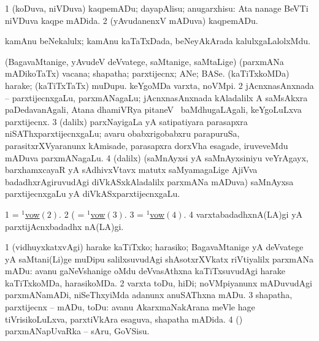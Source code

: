 \bentry 
{} 
\gl{\sakirx}
\expl{}
\bmng
\bnum
\num{1} (koDuva, niVDuva) kaqpemADu; dayapAlisu; anugarxhisu:  Ata nanage BeVTi niVDuva kaqpe mADida. 
\num{2} (yAvudanenxV mADuva) kaqpemADu. 
\enum
\emng
\eentry

\bentry 
{} 
\gl{\nA}
\expl{}
\bmng
 kamAnu beNekalulx; kamAnu kaTaTxDada, beNeyAkArada kalulxgaLalolxMdu. 
\emng
\eentry

\bentry 
{} 
\gl{\nA}
\expl{}
\bmng
\bnum
{} (BagavaMtanige, yAvudeV deVvatege, saMtanige, saMtaLige) 
\banum
{} (parxmANa mADikoTaTx) vacana; shapatha; parxtijecnx; ANe; BASe. 
 (kaTiTxkoMDa) harake; (kaTiTxTaTx) muDupu. 
 keYgoMDa varxta, noVMpi. 
\hypertarget{vow(1)2}{} 
\eanum
\numie
\num{2} jAcnxnasAnxnada -- parxtijecnxgaLu, parxmANagaLu; jAcnxnasAnxnada kAladalilx A saMsAkxra paDedavanAgali, Atana dhamiVRya pitaneV \mo\ baMdhugaLAgali, keYgoLuLxva parxtijecnx. 
\hypertarget{vow(1)3}{} 
\num{3} (\bava dalilx) parxNayigaLa yA satipatiyara parasapxra niSAThxparxtijecnxgaLu; avaru obabxrigobabxru parapuruSa, parasitxrXVyaranunx kAmisade, parasapxra dorxVha esagade, iruveveMdu mADuva parxmANagaLu. 
\hypertarget{vow(1)4}{} 
\num{4} (\bava dalilx) (saMnAyxsi yA saMnAyxsiniyu veYrAgayx, barxhamxcayaR yA sAdhivxVtavx matutx saMyamagaLige AjiVva badadhxrAgiruvudAgi diVkASxkAladalilx parxmANa mADuva) saMnAyxsa parxtijecnxgaLu yA diVkASxparxtijecnxgaLu. 
\enum
\emng

\noindent 
\gl{\pagu}
\expl{}
\bmng
\bnum
\num{1}  = \hyperlink{vow(1)2}{$^1$vow\((2)\)}. 
\num{2}  (  = \hyperlink{vow(1)3}{$^1$vow\((3)\)}. 
\num{3}  = \hyperlink{vow(1)4}{$^1$vow\((4)\)}. 
\num{4}  varxtabadadhxnA(LA)gi yA parxtijAcnxbadadhx nA(LA)gi. 
\enum
\emng
\eentry

\bentry
{} 
\pron{}
\gl{\sakirx}
\expl{}
\bmng
\bnum
\num{1} (vidhuyxkatxvAgi) harake kaTiTxko; harasiko; BagavaMtanige yA deVvatege yA saMtani(Li)ge muDipu salilxsuvudAgi shAsotxrXVkatx riVtiyalilx parxmANa mADu:  avanu gaNeVshanige oMdu deVvasAthxna kaTiTxsuvudAgi harake kaTiTxkoMDa, harasikoMDa. 
\num{2} varxta toDu, hiDi; noVMpiyanunx mADuvudAgi parxmANamADi, niSeThxyiMda adanunx anuSAThxna mADu. 
\num{3} shapatha, parxtijecnx -- mADu, toDu:  avanu AkarxmaNakArana meVle hage tiVrisikoLuLxva, parxtiVkAra esaguva, shapatha mADida. 
\num{4} (\pArxparx) parxmANapUvaRka -- sAru, GoVSisu. 
\enum
\emng
\eentry

